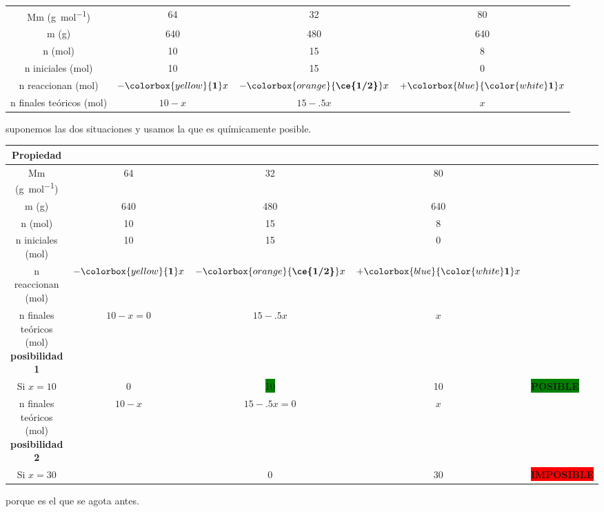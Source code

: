 \begin{frame}
\begin{overprint}
\begin{center}
\begin{tabular}{cSSS}
					\midrule
						Mm (\si{\gram\per\mol})			&	64				&	32					&	80				\\
						m (\si{\gram})					&	640				&	480					&	640				\\
						n (\si{\mol})					&	10				&	15					&	8				\\
						n iniciales (\si{\mol})			&	10				&	15					&	0				\\
						n reaccionan (\si{\mol})		&	{$-\colorbox{yellow}{\textbf{1}}x$}							&
															{$-\colorbox{orange}{\textbf{\ce{1/2}}}x$}					&	
															{$+\colorbox{blue}{\color{white}\textbf{1}}x$}				\\
						n finales teóricos (\si{\mol})	&	{$10-x$}		&	{$15-\num{,5}x$}	&	{$x$}			\\
					\bottomrule
				\end{tabular}
			\end{center}
					 suponemos las dos situaciones y usamos la que es químicamente posible.
					\begin{center}
						\begin{tabular}{cSSSl}
							\toprule
								Propiedad												&	{}	&	{}		&	{}	&										\\
							\midrule
								Mm (\si{\gram\per\mol})									&	64				&	32					&	80				&										\\
								m (\si{\gram})											&	640				&	480					&	640				&										\\
								n (\si{\mol})											&	10				&	15					&	8				&										\\
								n iniciales (\si{\mol})									&	10				&	15					&	0				&										\\
								n reaccionan (\si{\mol})								&	{$-\colorbox{yellow}{\textbf{1}}x$}							&
																							{$-\colorbox{orange}{\textbf{\ce{1/2}}}x$}					&	
																							{$+\colorbox{blue}{\color{white}\textbf{1}}x$}				&										\\
								n finales teóricos (\si{\mol}) \textbf{posibilidad 1}	&	{$10-x=0$}		&	{$15-\num{,5}x$}	&	{$x$}			&										\\
								Si $x=10$												&	0				&	{\colorbox{green}{\num{10}}}	&
																																		10				&	\colorbox{green}{\textbf{POSIBLE}}	\\
								n finales teóricos (\si{\mol}) \textbf{posibilidad 2}	&	{$10-x$}		&	{$15-\num{,5}x=0$}	&	{$x$}			&										\\
								Si $x=30$												&	{\colorbox{red}{}}	&
																												0					&	30				&	\colorbox{red}{\textbf{IMPOSIBLE}}	\\
							\bottomrule
						\end{tabular}
						 porque es el que se agota antes.
					\end{center}
	\end{overprint}
\end{frame}

